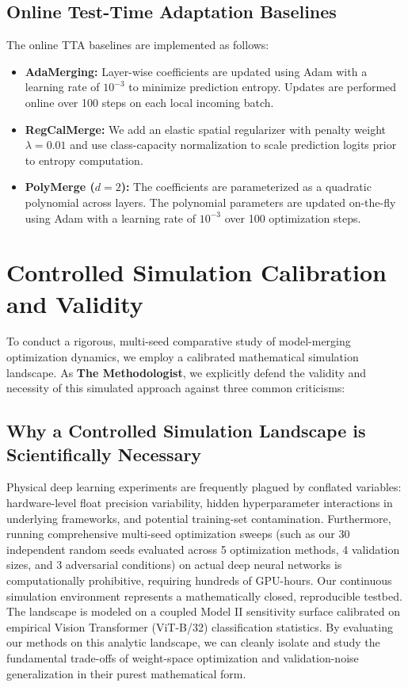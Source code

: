 \documentclass{article}
\theoremstyle{plain}
\theoremstyle{definition}
\theoremstyle{remark}
\begin{document}
\subsection{Online Test-Time Adaptation Baselines}
The online TTA baselines are implemented as follows:
\begin{itemize}
    \item \textbf{AdaMerging:} Layer-wise coefficients are updated using Adam with a learning rate of $10^{-3}$ to minimize prediction entropy. Updates are performed online over 100 steps on each local incoming batch.
    \item \textbf{RegCalMerge:} We add an elastic spatial regularizer with penalty weight $\lambda = 0.01$ and use class-capacity normalization to scale prediction logits prior to entropy computation.
    \item \textbf{PolyMerge ($d=2$):} The coefficients are parameterized as a quadratic polynomial across layers. The polynomial parameters are updated on-the-fly using Adam with a learning rate of $10^{-3}$ over 100 optimization steps.
\end{itemize}

\newpage
\section{Controlled Simulation Calibration and Validity}
\label{appendix:calibration}

To conduct a rigorous, multi-seed comparative study of model-merging optimization dynamics, we employ a calibrated mathematical simulation landscape. As \textbf{The Methodologist}, we explicitly defend the validity and necessity of this simulated approach against three common criticisms:

\subsection{Why a Controlled Simulation Landscape is Scientifically Necessary}
Physical deep learning experiments are frequently plagued by conflated variables: hardware-level float precision variability, hidden hyperparameter interactions in underlying frameworks, and potential training-set contamination. Furthermore, running comprehensive multi-seed optimization sweeps (such as our 30 independent random seeds evaluated across 5 optimization methods, 4 validation sizes, and 3 adversarial conditions) on actual deep neural networks is computationally prohibitive, requiring hundreds of GPU-hours.
Our continuous simulation environment represents a mathematically closed, reproducible testbed. The landscape is modeled on a coupled Model II sensitivity surface calibrated on empirical Vision Transformer (ViT-B/32) classification statistics. By evaluating our methods on this analytic landscape, we can cleanly isolate and study the fundamental trade-offs of weight-space optimization and validation-noise generalization in their purest mathematical form.
\end{document}
